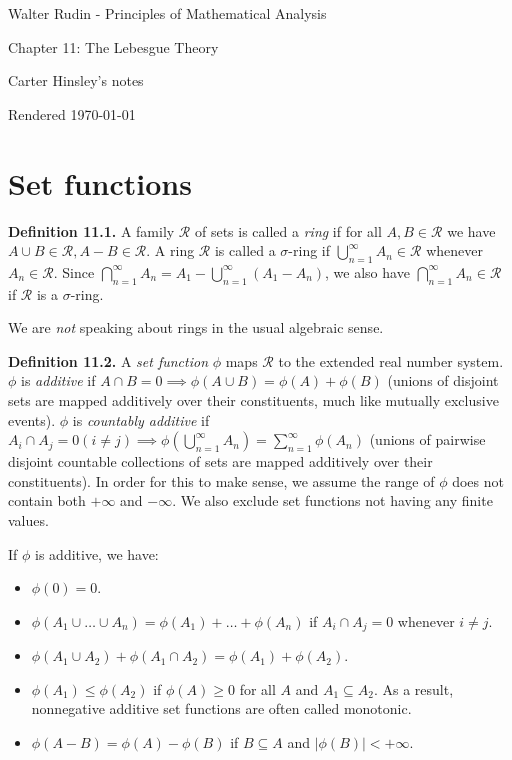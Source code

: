 \documentclass[a4paper]{article}
\begin{document}
\begin{center}
\LARGE{Walter Rudin - Principles of Mathematical Analysis}

\Large{Chapter 11: The Lebesgue Theory}

\large{Carter Hinsley's notes}

Rendered \today
\end{center}

\section{Set functions}

\textbf{Definition 11.1.} A family $\mathscr{R}$ of sets is called a \emph{ring} if for all $A, B \in \mathscr{R}$ we have $A \cup B \in \mathscr{R}, A - B \in \mathscr{R}$. A ring $\mathscr{R}$ is called a $\sigma$-ring if $\bigcup_{n=1}^\infty A_n \in \mathscr{R}$ whenever $A_n \in \mathscr{R}$. Since $\bigcap_{n=1}^\infty A_n = A_1 - \bigcup_{n=1}^\infty (A_1 - A_n)$, we also have $\bigcap_{n=1}^\infty A_n \in \mathscr{R}$ if $\mathscr{R}$ is a $\sigma$-ring.

We are \emph{not} speaking about rings in the usual algebraic sense.

\textbf{Definition 11.2.} A \emph{set function} $\phi$ maps $\mathscr{R}$ to the extended real number system. $\phi$ is \emph{additive} if $A \cap B = 0 \implies \phi(A \cup B) = \phi(A) + \phi(B)$ (unions of disjoint sets are mapped additively over their constituents, much like mutually exclusive events). $\phi$ is \emph{countably additive} if $A_i \cap A_j = 0 (i \neq j) \implies \phi\left(\bigcup_{n=1}^\infty A_n\right) = \sum_{n=1}^\infty \phi(A_n)$ (unions of pairwise disjoint countable collections of sets are mapped additively over their constituents). In order for this to make sense, we assume the range of $\phi$ does not contain both $+\infty$ and $-\infty$. We also exclude set functions not having any finite values.

If $\phi$ is additive, we have:
\begin{itemize}
    \item $\phi(0) = 0$.
    \item $\phi(A_1 \cup \ldots \cup A_n) = \phi(A_1) + \ldots + \phi(A_n)$ if $A_i \cap A_j = 0$ whenever $i \neq j$.
    \item $\phi(A_1 \cup A_2) + \phi(A_1 \cap A_2) = \phi(A_1) + \phi(A_2)$.
    \item $\phi(A_1) \leq \phi(A_2)$ if $\phi(A) \geq 0$ for all $A$ and $A_1 \subseteq A_2$. As a result, nonnegative additive set functions are often called monotonic.
    \item $\phi(A - B) = \phi(A) - \phi(B)$ if $B \subseteq A$ and $|\phi(B)| < +\infty$.
\end{itemize}
\end{document}
